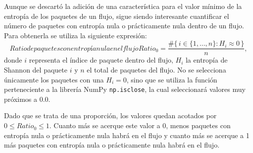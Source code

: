 Aunque se descartó la adición de una característica para el valor mínimo de la entropía de los paquetes de un flujo, sigue siendo interesante cuantificar el número de paquetes con entropía nula o prácticamente nula dentro de un flujo. Para obtenerla se utiliza la siguiente expresión:
\begin{equation}[eq:ratio-cero-paquetes-flujo]{Ratio de paquetes con entropía nula en el flujo}
Ratio_0 = \frac{\#\{\, i \in \{1,\ldots,n\} : H_i \approx 0 \,\}}{n}
,\end{equation}donde $i$ representa el índice de paquete dentro del flujo, $H_i$ la entropía de Shannon del paquete $i$ y $n$ el total de paquetes del flujo. No se selecciona únicamente los paquetes con una $H_i = 0$, sino que se utiliza la función perteneciente a la librería NumPy \texttt{np.isclose}, la cual seleccionará valores muy próximos a $0.0$.

Dado que se trata de una proporción, los valores quedan acotados por $0 \leq Ratio_0 \leq 1$. Cuanto más se acerque este valor a 0, menos paquetes con entropía nula o prácticamente nula habrá en el flujo y cuanto más se acerque a 1 más paquetes con entropía nula o prácticamente nula habrá en el flujo.



